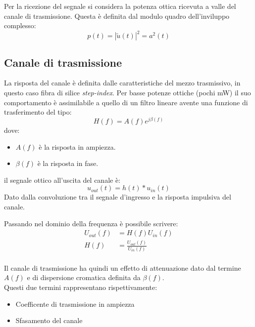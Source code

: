 \documentclass[12pt, a4paper]{article}
\begin{document}
Per la ricezione del segnale si considera la potenza ottica ricevuta a valle del canale di trasmissione.
Questa è definita dal modulo quadro dell'inviluppo complesso:
\begin{equation}
	p(t) = |\tilde{u}(t)|^2 = a^2(t)
\end{equation}


\subsection{Canale di trasmissione}
\label{sub:Canale}

La risposta del canale è definita dalle caratteristiche del mezzo trasmissivo, in questo caso fibra di silice \textit{step-index}.
Per basse potenze ottiche (pochi mW) il suo comportamento è assimilabile a quello di un filtro lineare avente una funzione di trasferimento del tipo:
\begin{equation}
	H(f) = A(f) e^{j\beta(f)}
\end{equation}
dove:\begin{itemize}
	\item $A(f)$ è la risposta in ampiezza.
	\item $\beta(f)$ è la risposta in fase.
\end{itemize}

il segnale ottico all'uscita del canale è:
\begin{equation}
	u_{out}(t) = h(t) \ast u_{in}(t)
\end{equation}
Dato dalla convoluzione tra il segnale d'ingresso e la risposta impulsiva del canale.

Passando nel dominio della frequenza è possibile scrivere:
\begin{align*}
	U_{out}(f) &= H(f)U_{in}(f)\\
	H(f) &= \frac{U_{out}(f)}{U_{in}(f)}\\
\end{align*}

Il canale di trasmissione ha quindi un effetto di attenuazione dato dal termine $A(f)$ e di dispersione cromatica definita da $\beta(f)$.\\
Questi due termini rappresentano rispettivamente:
\begin{itemize}
	\item Coefficente di trasmissione in ampiezza
	\item Sfasamento del canale
\end{itemize}

\end{document}
